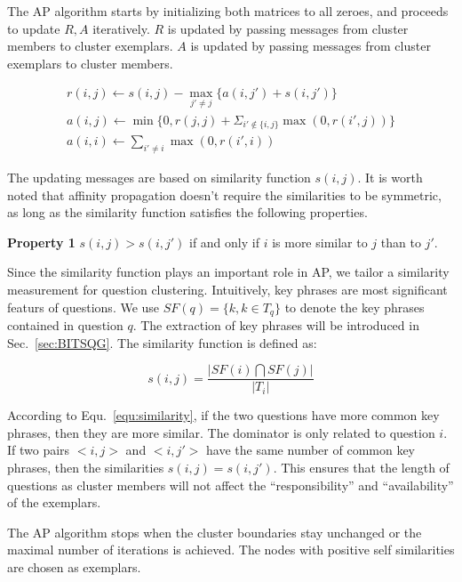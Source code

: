 \documentclass{llncs}
\begin{document}
The AP algorithm starts by initializing both matrices to all zeroes, and proceeds to update $R,A$ iteratively. $R$ is updated by passing messages from cluster members to cluster exemplars. $A$ is updated by passing messages from cluster exemplars to cluster members.

\begin{eqnarray}
r(i,j)\leftarrow s(i,j)-\max _{j'\neq j}\{a(i,j')+s(i,j')\}\\
a(i,j) \leftarrow \min \{ 0, r(j,j) + \Sigma_{i' \not\in \{i,j\}} \max(0, r(i',j)) \} \\
a(i,i) \leftarrow \sum_{i' \neq i} \max(0, r(i',i))
\end{eqnarray}


The updating messages are based on similarity function $s(i,j)$. It is worth noted that affinity propagation doesn't require the similarities to be symmetric, as long as the similarity function satisfies the following properties.



\textbf{Property 1} $s(i, j) > s(i, j')$ if and only if $i$ is more similar to $j$ than to $j'$.



Since the similarity function plays an important role in AP, we tailor a similarity measurement for question clustering. Intuitively, key phrases are most significant featurs of questions. We use $SF(q)=\{k,k \in T_q\}$ to denote the key phrases contained in question $q$. The extraction of key phrases will be introduced in Sec.~\ref{sec:BITSQG}. The similarity function is defined as:



\begin{equation}\label{equ:similarity}
s(i,j)=\frac{|SF(i)\bigcap SF(j)|}{|T_i|}
\end{equation}





According to Equ.~\ref{equ:similarity}, if the two questions have more common key phrases, then they are more similar. The dominator is only related to question $i$. If two pairs $<i,j>$ and $<i,j'>$ have the same number of common key phrases, then the similarities $s(i,j)=s(i,j')$. This ensures that the length of questions as cluster members will not affect the ``responsibility'' and ``availability'' of the exemplars.





The AP algorithm stops when the cluster boundaries stay unchanged or the maximal number of iterations is achieved. The nodes with positive self similarities are chosen as exemplars. %
\end{document}
